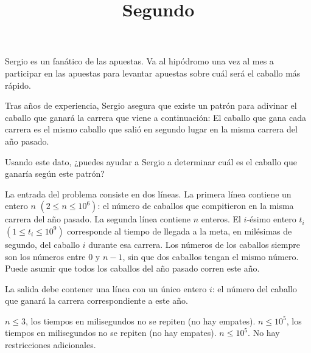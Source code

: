 \documentclass{oci}
\title{Segundo}
\begin{document}
\begin{problemDescription}
Sergio es un fanático de las apuestas.
Va al hipódromo una vez al mes a participar en las apuestas para levantar apuestas sobre cuál será el caballo más rápido.

Tras años de experiencia, Sergio asegura que existe un patrón para adivinar el caballo que ganará la carrera que viene a continuación:
El caballo que gana cada carrera es el mismo caballo que salió en segundo lugar en la misma carrera del año pasado.

Usando este dato, ¿puedes ayudar a Sergio a determinar cuál es el caballo que ganaría según este patrón?
\end{problemDescription}

\begin{inputDescription}
La entrada del problema consiste en dos líneas.
La primera línea contiene un entero $n$ $(2 \le n \le 10^6)$: el número de caballos que compitieron en la misma carrera del año pasado.
La segunda línea contiene $n$ enteros. El $i$-ésimo entero $t_i$ $(1 \le t_i \le 10^9)$ corresponde al tiempo de llegada a la meta, en milésimas de segundo, del caballo $i$ durante esa carrera. Los números de los caballos siempre son los números entre $0$ y $n-1$, sin que dos caballos tengan el mismo número.
Puede asumir que todos los caballos del año pasado corren este año.
\end{inputDescription}

\begin{outputDescription}
La salida debe contener una línea con un único entero $i$: el número del caballo que ganará la carrera correspondiente a este año.
\end{outputDescription}

\begin{scoreDescription}
  $n \le 3$, los tiempos en milisegundos no se repiten (no hay empates).
  $n \le 10^5$, los tiempos en milisegundos no se repiten (no hay empates).
  $n \le 10^5$.
  No hay restricciones adicionales.
\end{scoreDescription}

\begin{sampleDescription}
\end{sampleDescription}
\end{document}
